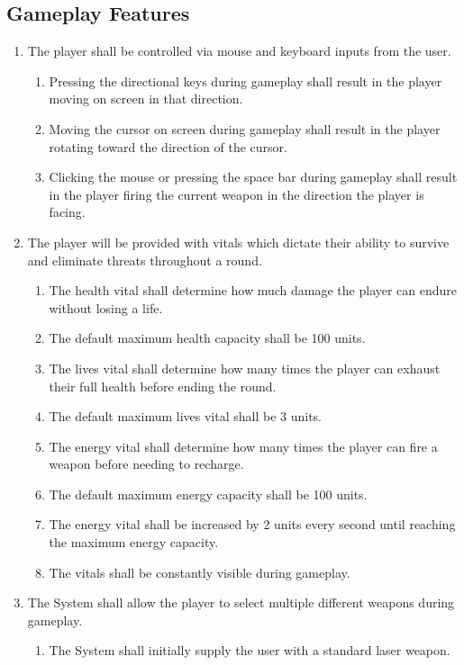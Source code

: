 \documentclass[12pt]{report}
\newenvironment{reqlist}{
	\renewcommand{\labelenumi}{\tab\thesubsection.\arabic{enumi}}
	\renewcommand{\labelenumii}{\thesubsection.\arabic{enumi}.\arabic{enumii}}
	\begin{enumerate}[itemsep = 1pt, parsep = 0pt, leftmargin = *]
}{\end{enumerate}}
\begin{document}
	\subsection{Gameplay Features}
		\begin{reqlist}
			\item The player shall be controlled via mouse and keyboard inputs from the user.
			\begin{reqlist}
				\item Pressing the directional keys during gameplay shall result in the player moving on screen in that direction.
				\item Moving the cursor on screen during gameplay shall result in the player rotating toward the direction of the cursor.
				\item Clicking the mouse or pressing the space bar during gameplay shall result in the player firing the current weapon in the direction the player is facing.
			\end{reqlist}
			\item The player will be provided with vitals which dictate their ability to survive and eliminate threats throughout a round.
			\begin{reqlist}
				\item The health vital shall determine how much damage the player can endure without losing a life.
				\item The default maximum health capacity shall be 100 units.
				\item The lives vital shall determine how many times the player can exhaust their full health before ending the round.
				\item The default maximum lives vital shall be 3 units.
				\item The energy vital shall determine how many times the player can fire a weapon before needing to recharge.
				\item The default maximum energy capacity shall be 100 units.
				\item The energy vital shall be increased by 2 units every second until reaching the maximum energy capacity.
				\item The vitals shall be constantly visible during gameplay.
			\end{reqlist}
			\item The System shall allow the player to select multiple different weapons during gameplay.
			\begin{reqlist}
				\item The System shall initially supply the user with a standard laser weapon.

\end{reqlist}
\end{reqlist}
\end{document}
